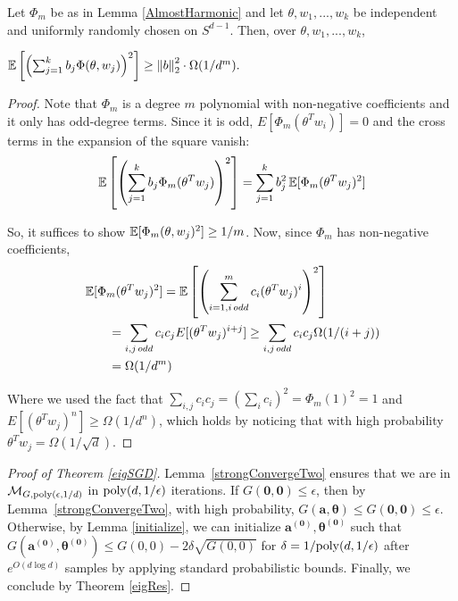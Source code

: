 \begin{lemma}\label{largeVariance}
  Let $\Phi_m$ be as in Lemma \ref{AlmostHarmonic}  and let $\theta, w_1,...,w_k$ be
  independent and uniformly randomly chosen on $S^{d-1}$. Then, over
  $\theta, w_1,...,w_k$,
 
 $\operatorname*{\mathbb{E}}\left[\left(  \sum_{j=1}^k b_j \Phi(\theta,w_j)\right)^2\right]
 \geq \left\lVert b \right\rVert_2^2 \cdot \Omega(1/d^m).$
\end{lemma}
%
\begin{proof}
Note that $\Phi_m$ is a degree $m$ polynomial with non-negative coefficients and it only has odd-degree terms. Since it is odd, $E[\Phi_m(\theta^Tw_i)] = 0$ and the cross terms in the expansion of the square vanish:
%
\[ \operatorname*{\mathbb{E}}\left[\left(  \sum_{j=1}^k b_j
     \Phi_m(\theta^Tw_j)\right)^2\right] = \sum_{j=1}^k b_j^2 \operatorname*{\mathbb{E}}[\Phi_m(\theta^Tw_j)^2]\]

So, it suffices to show $\operatorname*{\mathbb{E}}[\Phi_m(\theta,w_j)^2] \geq 1/m$.  Now, since $\Phi_m$ has non-negative coefficients,
\begin{align*}
& \operatorname*{\mathbb{E}}[\Phi_m(\theta^Tw_j)^2] = \operatorname*{\mathbb{E}}\left[\left(\sum_{i=1, i \,
                               odd}^m c_i
                               (\theta^Tw_j)^i\right)^2\right] \\
& \qquad = \sum_{i,j \,odd} c_ic_j E[(\theta^Tw_j)^{i+j}] \geq \sum_{i,j
  \,odd}c_i c_j \Omega(1/(i+j))  \\
& \qquad =\Omega(1/d^m) 
\end{align*}

Where we used the fact that
$\sum_{i,j} c_ic_j = (\sum_i c_i)^2 = \Phi_m(1)^2 = 1$ and
$E[(\theta^Tw_j)^{n}] \geq \Omega(1/d^{n})$, which holds by noticing that with high probability $\theta^T w_j = \Omega(1/\sqrt{d})$. 
\end{proof}

\fi 
 
\begin{proof}[Proof of Theorem \ref{eigSGD}]
Lemma~\ref{strongConvergeTwo} ensures that we are in $\mathcal{M}_{G,\mathrm{poly}(\epsilon,1/d)}$ in $\mathrm{poly}(d,1/\epsilon)$ iterations.
If $G(\boldsymbol{0,0}) \leq \epsilon$, then by Lemma~\ref{strongConvergeTwo}, with high probability, $G(\boldsymbol{a,\theta}) \leq G(\boldsymbol{0,0}) \leq \epsilon$. Otherwise, by Lemma \ref{initialize},  we can initialize $\boldsymbol{a^{(0)},\theta^{(0)}}$ such that $G(\boldsymbol{a^{(0)},\theta^{(0)}}) \leq  G(0,0) - 2\delta \sqrt{G(0,0)}$ for $\delta = 1/\mathrm{poly}(d,1/\epsilon)$ after $e^{O(d\log d)}$ samples by applying standard probabilistic bounds. Finally, we conclude by Theorem \ref{eigRes}.
\end{proof}
%

